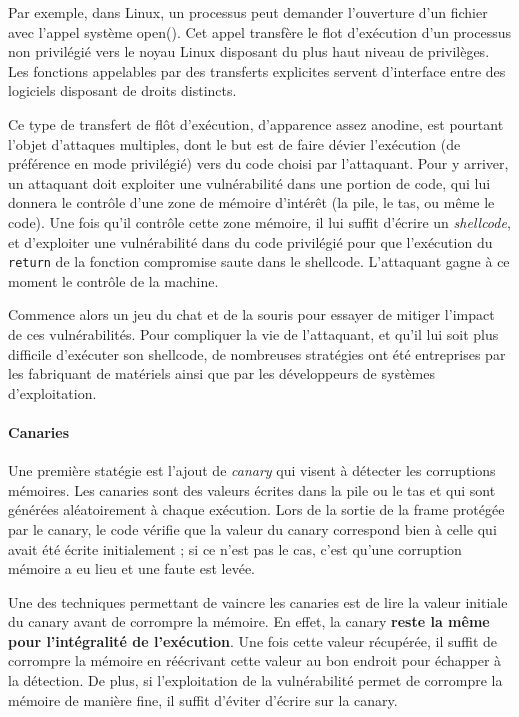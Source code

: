 Par exemple, dans Linux, un processus peut demander l’ouverture d’un fichier avec l’appel système open(). Cet appel transfère le flot d’exécution d’un processus non privilégié vers le noyau Linux disposant du plus haut niveau de privilèges. Les fonctions appelables par des transferts explicites servent d’interface entre des logiciels disposant de droits distincts.



Ce type de transfert de flôt d'exécution, d'apparence assez anodine, est pourtant l'objet d'attaques multiples, dont le but est de faire dévier l'exécution (de préférence en mode privilégié) vers du code choisi par l'attaquant. Pour y arriver, un attaquant doit exploiter une vulnérabilité dans une portion de code, qui lui donnera le contrôle d'une zone de mémoire d'intérêt (la pile, le tas, ou même le code). Une fois qu'il contrôle cette zone mémoire, il lui suffit d'écrire un \emph{shellcode}, et d'exploiter une vulnérabilité dans du code privilégié pour que l'exécution du \texttt{return} de la fonction compromise saute dans le shellcode. L'attaquant gagne à ce moment le contrôle de la machine.

Commence alors un jeu du chat et de la souris pour essayer de mitiger l'impact de ces vulnérabilités. Pour compliquer la vie de l'attaquant, et qu'il lui soit plus difficile d'exécuter son shellcode, de nombreuses stratégies ont été entreprises par les fabriquant de matériels ainsi que par les développeurs de systèmes d'exploitation. 

\paragraph{Canaries}
Une première statégie est l'ajout de \emph{canary} qui visent à détecter les corruptions mémoires. Les canaries sont des valeurs écrites dans la pile ou le tas et qui sont générées aléatoirement à chaque exécution. Lors de la sortie de la frame protégée par le canary, le code vérifie que la valeur du canary correspond bien à celle qui avait été écrite initialement ; si ce n'est pas le cas, c'est qu'une corruption mémoire a eu lieu et une faute est levée.

Une des techniques permettant de vaincre les canaries est de lire la valeur initiale du canary avant de corrompre la mémoire. En effet, la canary \textbf{reste la même pour l'intégralité de l'exécution}. Une fois cette valeur récupérée, il suffit de corrompre la mémoire en réécrivant cette valeur au bon endroit pour échapper à la détection. De plus, si l'exploitation de la vulnérabilité permet de corrompre la mémoire de manière fine, il suffit d'éviter d'écrire sur la canary.

